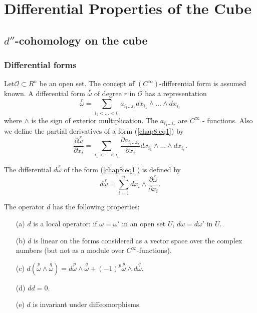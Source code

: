 \part{Differential Properties of the Cube}\label{partII}

\chapter{\texorpdfstring{$d''$}{d''}-cohomology on the cube}\label{chap8}

\section{Differential forms}\label{chap8:sec1}

Let\pageoriginale  $\mathscr{O} \subset R^n$ be an open set. The concept of
$(C^\infty)$-differential form is assumed known. A differential form
$\overset{r}{\omega}$ of degree $r$ in $\mathscr{O}$ has a
representation 
\begin{equation*}
\overset{r}{\omega} = \sum\limits_{i_1 < \ldots < i_r} a_{i_1 \ldots
  i_r} dx_{i_1} \wedge \ldots \wedge dx_{i_r}\tag{1}\label{chap8:eq1}
\end{equation*}
where $\wedge$ is the sign of exterior multiplication. The $a_{i_1
  \ldots i_r}$ are $C^\infty$ - functions. Also we define the partial
derivatives of a form (\ref{chap8:eq1}) by 
$$
\frac{\partial \overset{r}{\omega}}{\partial x_i} = \sum\limits_{i_1 <
\ldots < i_r} \frac{\partial a_{i_1 \ldots i_r}}{\partial x_i}
dx_{i_1} \wedge \ldots \wedge dx_{i_r}. 
$$

The differential $d \overset{r}{\omega}$ of the form (\ref{chap8:eq1}) is defined by
$$
d \overset{r}{\omega} = \sum\limits_{i=1}^n dx_i \wedge \frac{\partial
\overset{r}{\omega}}{\partial x_i}. 
$$

The operator $d$ has the following properties:
\begin{itemize}
\item[(a)] $d$ is a local operator: if $\omega = \omega'$ in an open
  set $U$, $d \omega = d\omega'$ in $U$. 

\item[(b)] $d$ is linear on the forms considered as a vector space
  over the complex numbers (but not as a module over
  $C^\infty$-functions). 

\item[(c)] $d(\overset{p}{\omega} \wedge \overset{q}{\omega}) = d
  \overset{p}{\omega} \wedge \overset{q}{\omega} + (-1)^p
  \overset{p}{\omega} \wedge d \overset{q}{\omega}$. 

\item[(d)] $d d = 0$. 

\item[(e)] $d$ is invariant under diffeomorphisms. 
\end{itemize}

